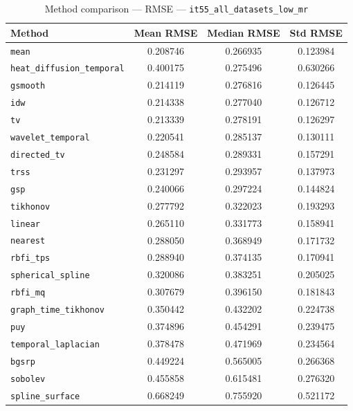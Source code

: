 \begin{table}[ht]
\centering
\caption{Method comparison — RMSE — \texttt{it55_all_datasets_low_mr}}
\label{tab:rmse_it55_all_datasets_low_mr}
\begin{tabular}{lccc}
\hline
Method & Mean RMSE & Median RMSE & Std RMSE \\
\hline
\texttt{mean} & 0.208746 & 0.266935 & 0.123984 \\
\texttt{heat_diffusion_temporal} & 0.400175 & 0.275496 & 0.630266 \\
\texttt{gsmooth} & 0.214119 & 0.276816 & 0.126445 \\
\texttt{idw} & 0.214338 & 0.277040 & 0.126712 \\
\texttt{tv} & 0.213339 & 0.278191 & 0.126297 \\
\texttt{wavelet_temporal} & 0.220541 & 0.285137 & 0.130111 \\
\texttt{directed_tv} & 0.248584 & 0.289331 & 0.157291 \\
\texttt{trss} & 0.231297 & 0.293957 & 0.137973 \\
\texttt{gsp} & 0.240066 & 0.297224 & 0.144824 \\
\texttt{tikhonov} & 0.277792 & 0.322023 & 0.193293 \\
\texttt{linear} & 0.265110 & 0.331773 & 0.158941 \\
\texttt{nearest} & 0.288050 & 0.368949 & 0.171732 \\
\texttt{rbfi_tps} & 0.288940 & 0.374135 & 0.170941 \\
\texttt{spherical_spline} & 0.320086 & 0.383251 & 0.205025 \\
\texttt{rbfi_mq} & 0.307679 & 0.396150 & 0.181843 \\
\texttt{graph_time_tikhonov} & 0.350442 & 0.432202 & 0.224738 \\
\texttt{puy} & 0.374896 & 0.454291 & 0.239475 \\
\texttt{temporal_laplacian} & 0.378478 & 0.471969 & 0.234564 \\
\texttt{bgsrp} & 0.449224 & 0.565005 & 0.266368 \\
\texttt{sobolev} & 0.455858 & 0.615481 & 0.276320 \\
\texttt{spline_surface} & 0.668249 & 0.755920 & 0.521172 \\
\hline
\end{tabular}
\end{table}
